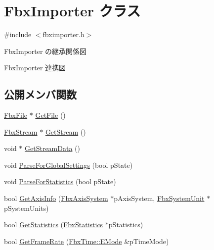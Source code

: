 \hypertarget{class_fbx_importer}{}\section{Fbx\+Importer クラス}
\label{class_fbx_importer}


{\ttfamily \#include $<$fbximporter.\+h$>$}



Fbx\+Importer の継承関係図


Fbx\+Importer 連携図
\subsection*{公開メンバ関数}
\begin{DoxyCompactItemize}
\item 
\hyperlink{class_fbx_file}{Fbx\+File} $\ast$ \hyperlink{class_fbx_importer_aae49abec02c1df7de8a7e12480607c08}{Get\+File} ()
\item 
\hyperlink{class_fbx_stream}{Fbx\+Stream} $\ast$ \hyperlink{class_fbx_importer_a7df99385df3407f5c17a9badf748fcab}{Get\+Stream} ()
\item 
void $\ast$ \hyperlink{class_fbx_importer_ab6b8c23dbcfa775b97467e430ff204ec}{Get\+Stream\+Data} ()
\item 
void \hyperlink{class_fbx_importer_a02c8d2c9b66de94b9434bf0225c67cd7}{Parse\+For\+Global\+Settings} (bool p\+State)
\item 
void \hyperlink{class_fbx_importer_a4a3340dfe262ac8a6c3ae6ebbc793201}{Parse\+For\+Statistics} (bool p\+State)
\item 
bool \hyperlink{class_fbx_importer_a57e28b23f1290b95ea49dcee58956f12}{Get\+Axis\+Info} (\hyperlink{class_fbx_axis_system}{Fbx\+Axis\+System} $\ast$p\+Axis\+System, \hyperlink{class_fbx_system_unit}{Fbx\+System\+Unit} $\ast$p\+System\+Units)
\item 
bool \hyperlink{class_fbx_importer_adbeaacef0c86132fcce5b585338e138d}{Get\+Statistics} (\hyperlink{class_fbx_statistics}{Fbx\+Statistics} $\ast$p\+Statistics)
\item 
bool \hyperlink{class_fbx_importer_aedbe9d10d808adcb39a84c72d71757cd}{Get\+Frame\+Rate} (\hyperlink{class_fbx_time_acc529b00a0e8d4c3da3702449ca93031}{Fbx\+Time\+::\+E\+Mode} \&p\+Time\+Mode)
\end{DoxyCompactItemize}
